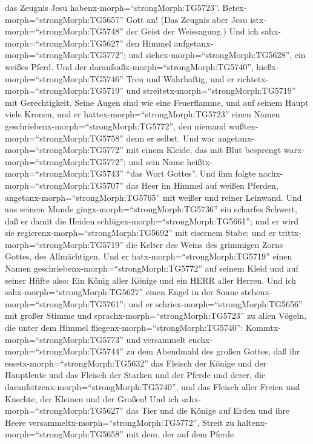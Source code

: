 das Zeugnis Jesu habenx-morph=``strongMorph:TG5723''.
Betex-morph=``strongMorph:TG5657'' Gott an! (Das Zeugnis aber Jesu
istx-morph=``strongMorph:TG5748'' der Geist der Weissagung.)
 Und ich sahx-morph=``strongMorph:TG5627'' den Himmel
aufgetanx-morph=``strongMorph:TG5772''; und
siehex-morph=``strongMorph:TG5628'', ein weißes Pferd. Und der
daraufsaßx-morph=``strongMorph:TG5740'',
hießx-morph=``strongMorph:TG5746'' Treu und Wahrhaftig, und er
richtetx-morph=``strongMorph:TG5719'' und
streitetx-morph=``strongMorph:TG5719'' mit Gerechtigkeit. 
Seine Augen sind wie eine Feuerflamme, und auf seinem Haupt viele
Kronen; und er hattex-morph=``strongMorph:TG5723'' einen Namen
geschriebenx-morph=``strongMorph:TG5772'', den niemand
wußtex-morph=``strongMorph:TG5758'' denn er selbst.  Und
war angetanx-morph=``strongMorph:TG5772'' mit einem Kleide, das mit Blut
besprengt warx-morph=``strongMorph:TG5772''; und sein Name
heißtx-morph=``strongMorph:TG5743'' ``das Wort Gottes''. 
Und ihm folgte nachx-morph=``strongMorph:TG5707'' das Heer im Himmel auf
weißen Pferden, angetanx-morph=``strongMorph:TG5765'' mit weißer und
reiner Leinwand.  Und aus seinem Munde
gingx-morph=``strongMorph:TG5736'' ein scharfes Schwert, daß er damit
die Heiden schlügex-morph=``strongMorph:TG5661''; und er wird sie
regierenx-morph=``strongMorph:TG5692'' mit eisernem Stabe; und er
trittx-morph=``strongMorph:TG5719'' die Kelter des Weins des grimmigen
Zorns Gottes, des Allmächtigen.  Und er
hatx-morph=``strongMorph:TG5719'' einen Namen
geschriebenx-morph=``strongMorph:TG5772'' auf seinem Kleid und auf
seiner Hüfte also: Ein König aller Könige und ein HERR aller Herren.
 Und ich sahx-morph=``strongMorph:TG5627'' einen Engel in
der Sonne stehenx-morph=``strongMorph:TG5761''; und er
schriex-morph=``strongMorph:TG5656'' mit großer Stimme und
sprachx-morph=``strongMorph:TG5723'' zu allen Vögeln, die unter dem
Himmel fliegenx-morph=``strongMorph:TG5740'':
Kommtx-morph=``strongMorph:TG5773'' und versammelt
euchx-morph=``strongMorph:TG5744'' zu dem Abendmahl des großen Gottes,
 daß ihr essetx-morph=``strongMorph:TG5632'' das Fleisch
der Könige und der Hauptleute und das Fleisch der Starken und der Pferde
und derer, die daraufsitzenx-morph=``strongMorph:TG5740'', und das
Fleisch aller Freien und Knechte, der Kleinen und der Großen!
 Und ich sahx-morph=``strongMorph:TG5627'' das Tier und die
Könige auf Erden und ihre Heere
versammeltx-morph=``strongMorph:TG5772'', Streit zu
haltenx-morph=``strongMorph:TG5658'' mit dem, der auf dem Pferde
